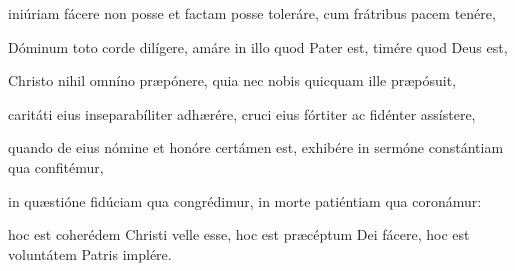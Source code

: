 {\noindent iniúriam fácere non posse et factam posse toleráre, cum frátribus pacem tenére,

\noindent Dóminum toto corde dilígere, amáre in illo quod Pater est, timére quod Deus est,

\noindent Christo nihil omníno præpónere, quia nec nobis quicquam ille præpósuit,

\noindent caritáti eius inseparabíliter adhærére, cruci eius fórtiter ac fidénter assístere,

\noindent quando de eius nómine et honóre certámen est, exhibére in sermóne constántiam qua confitémur,

\noindent in quæstióne fidúciam qua congrédimur, in morte patiéntiam qua coronámur:

\noindent hoc est coherédem Christi velle esse, hoc est præcéptum Dei fácere, hoc est voluntátem Patris implére.}
\newcommand{\responsoriumiii}{\pars{Responsorium 3.} \scriptura{\Rbardot{} 2 Mac. 14, 35-36 \Vbardot{} Ps. 79, 2; \textbf{H415}}

\vspace{-5mm}

\responsorium{II}{temporalia/resp-tudomineuniversorum-CROCHU-cumdox.gtex}{}}


